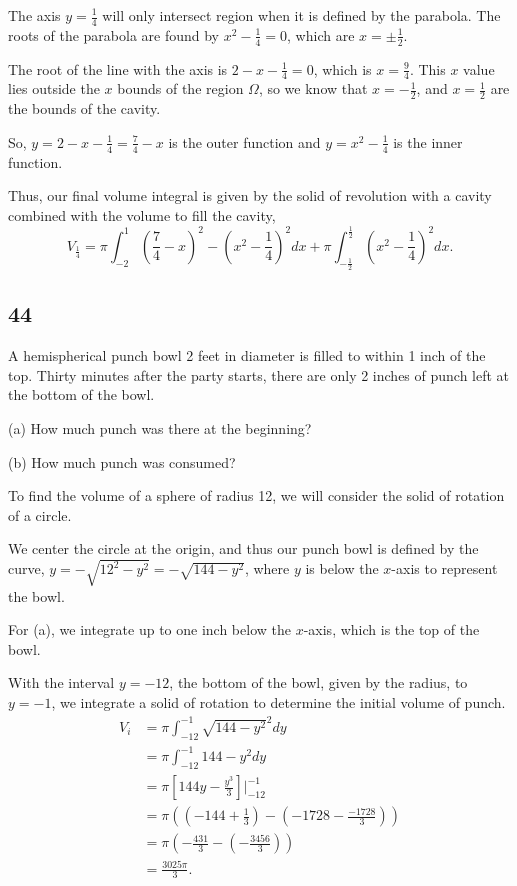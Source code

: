 \documentclass[../hw6.tex]{subfiles}
\begin{document}
The axis $y=\frac{1}{4}$ will only intersect region when it is defined by the parabola. 
The roots of the parabola are found by $x^2-\frac{1}{4}=0$, which are $x=\pm \frac{1}{2}$. 

The root of the line with the axis is $2-x-\frac{1}{4}=0$, which is $x=\frac{9}{4}$. This $x$ value lies outside the $x$ bounds of the region $\Omega$, so we know that $x=-\frac{1}{2}$, and $x=\frac{1}{2}$ are the bounds of the cavity.

So, $y=2-x-\frac{1}{4}=\frac{7}{4}-x$ is the outer function and $y=x^2-\frac{1}{4}$ is the inner function.

Thus, our final volume integral is given by the solid of revolution with a cavity combined with the volume to fill the cavity, 
\[V_{\frac{1}{4}} = \pi \int_{-2}^{1} {\left( \frac{7}{4} - x\right)}^2 - {\left( x^2-\frac{1}{4} \right)}^2 dx + \pi \int_{-\frac{1}{2}}^{\frac{1}{2}} {\left( x^2-\frac{1}{4} \right)}^2 dx.\]


\subsection*{44}
A hemispherical punch bowl 2 feet in diameter is filled to
within 1 inch of the top. Thirty minutes after the party starts,
there are only 2 inches of punch left at the bottom of the bowl.

(a) How much punch was there at the beginning?

(b) How much punch was consumed?

To find the volume of a sphere of radius 12, we will consider the solid of rotation of a circle.

We center the circle at the origin, and thus our punch bowl is defined by the curve, $y=-\sqrt{12^2-y^2}=-\sqrt{144-y^2}$, where $y$ is below the $x$-axis to represent the bowl.

For (a), we integrate up to one inch below the $x$-axis, which is the top of the bowl.

With the interval $y=-12$, the bottom of the bowl, given by the radius, to $y=-1$, we integrate a solid of rotation to determine the initial volume of punch.
\begin{align*}
    V_i &= \pi \int_{-12}^{-1} {\sqrt{144-y^2}}^2 dy \\
    &= \pi \int_{-12}^{-1} 144-y^2 dy \\
    &= \pi \left[ 144y-\frac{y^3}{3} \right] \Bigg\vert_{-12}^{-1}\\
    &= \pi \left( \left( -144+\frac{1}{3} \right) - \left( -1728-\frac{-1728}{3} \right)\right) \\
    &= \pi \left( -\frac{431}{3} - \left( -\frac{3456}{3} \right) \right) \\
    &= \frac{3025\pi}{3}. \\
\end{align*}
\end{document}
